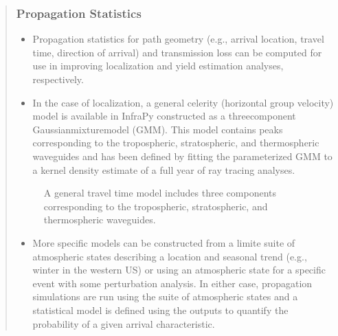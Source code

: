 \documentclass[letterpaper,10pt,english]{sphinxmanual}
\let\sphinxpxdimen\pdfpxdimen\else\newdimen\sphinxpxdimen
\begin{document}
\begin{itemize}
\begin{quote}
\begin{itemize}
\end{itemize}


\subsubsection{Propagation Statistics}
\label{\detokenize{propagation:propagation-statistics}}\label{\detokenize{propagation:propagation}}\label{\detokenize{propagation::doc}}\begin{itemize}
\item {} 
\sphinxAtStartPar
Propagation statistics for path geometry (e.g., arrival location, travel time, direction of arrival) and transmission loss can be computed for use in improving localization and yield estimation analyses, respectively.

\item {} 
\sphinxAtStartPar
In the case of localization, a general celerity (horizontal group velocity) model is available in InfraPy constructed as a three\sphinxhyphen{}component Gaussian\sphinxhyphen{}mixture\sphinxhyphen{}model (GMM).  This model contains peaks corresponding to the tropospheric, stratospheric, and thermospheric waveguides and has been defined by fitting the parameterized GMM to a kernel density estimate of a full year of ray tracing analyses.

\end{itemize}

\begin{figure}[htbp]
\centering
\capstart

\noindent\sphinxincludegraphics[width=500\sphinxpxdimen]{{cel_dist}.jpg}
\caption{A general travel time model includes three components corresponding to the tropospheric, stratospheric, and thermospheric waveguides.}\label{\detokenize{propagation:id1}}\end{figure}
\begin{itemize}
\item {} 
\sphinxAtStartPar
More specific models can be constructed from a limite suite of atmospheric states describing a location and seasonal trend (e.g., winter in the western US) or using an atmospheric state for a specific event with some perturbation analysis.  In either case, propagation simulations are run using the suite of atmospheric states and a statistical model is defined using the outputs to quantify the probability of a given arrival characteristic.

\end{itemize}

\begin{figure}[htbp]
\centering
\capstart


\end{figure}
\end{quote}
\end{itemize}
\end{document}
